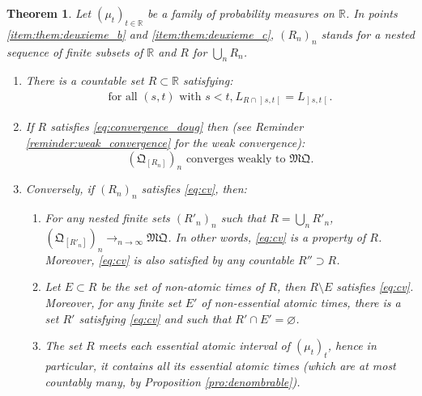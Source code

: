 \documentclass[JEP,XML,SOM,Unicode,NoEqCountersInSection,NoFloatCountersInSection,published]{cedram}
\theoremstyle{plain}
\newtheorem{them}{Theorem}[section]
\theoremstyle{definition}
\newcommand{\como}{\mathfrak{Q}}
\newcommand{\mq}{\mathfrak{MQ}}
\newcommand{\R}{\mathbb{R}}
\newcommand{\op}{\mathopen}
\newcommand{\clo}{\mathclose}
\begin{document}
\begin{them}\label{them:deuxieme_sec} Let $(\mu_t)_{t\in \R}$ be a family of probability measures on $\R$. In points \eqref{item:them:deuxieme_b} and \eqref{item:them:deuxieme_c}, $(R_n)_n$ stands for a nested sequence of finite subsets of\/ $\R$ and $R$ for $\bigcup_nR_n$.

\begin{enumerate}
\item
\label{item:them:deuxieme_a} There is a countable set $R\subset\R$ satisfying:
\begin{gather}\label{eq:convergence_doug}
\text{for all $(s,t)$ with $s<t$,}\ L_{R\cap\op]s,t\clo[}=L_{\op]s,t\clo[}.
\end{gather}

\item
\label{item:them:deuxieme_b} If $R$ satisfies \eqref{eq:convergence_doug} then (see Reminder \ref{reminder:weak_convergence} for the weak convergence):
\begin{equation}\label{eq:cv}
\text{$(\como_{[R_n]})_n$ converges weakly to $\mq$.}
\end{equation}

\item
\label{item:them:deuxieme_c} Conversely, if $(R_n)_n$ satisfies \eqref{eq:cv}, then:
\begin{enumerate}
\item\label{item:ordre_facultatif}
For any nested finite sets $(R'_n)_n$ such that $R=\bigcup_nR'_n$, $(\como_{[R'_n]})_n\to_{n\to\infty}\mq$. In other words, \eqref{eq:cv} is a property of $R$. Moreover, \eqref{eq:cv} is also satisfied by any countable $R''\supset R$.
\item\label{item:inatomique_facultatif}
Let $E\subset R$ be the set of non-atomic times of $R$, then $R\setminus E$ satisfies \eqref{eq:cv}. Moreover, for any finite set $E'$ of non-essential atomic times, there is a set $R'$ satisfying \eqref{eq:cv} and such that $R'\cap E'=\varnothing$.
\item\label{item:essentiel_necessaire}
The set $R$ meets each essential atomic interval of $(\mu_t)_t$, hence in particular, it contains all its essential atomic times (which are at most countably many, by Proposition \ref{pro:denombrable}).
\end{enumerate}
\end{enumerate}
\end{them}
\end{document}
